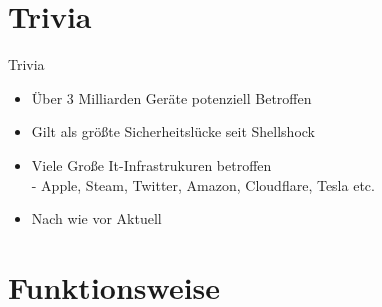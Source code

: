 \documentclass{beamer}
\begin{document}
\section{Trivia}
\begin{frame}{Trivia}
 \begin{itemize}
  \item Über 3 Milliarden Geräte potenziell Betroffen
  \item Gilt als größte Sicherheitslücke seit Shellshock
  \item Viele Große It-Infrastrukuren betroffen\\
  - Apple, Steam, Twitter, Amazon, Cloudflare, Tesla etc.
  \item Nach wie vor Aktuell
  
  
 \end{itemize}

\end{frame}

\section{Funktionsweise}
\end{document}
